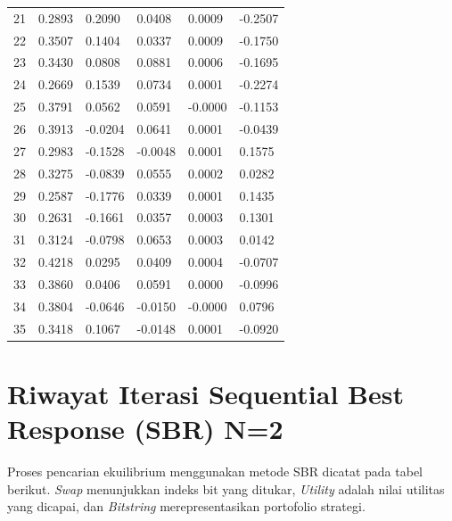 \begin{footnotesize}
\begin{longtable}{llllll}
21 & 0.2893 & 0.2090 & 0.0408 & 0.0009 & -0.2507 \\
22 & 0.3507 & 0.1404 & 0.0337 & 0.0009 & -0.1750 \\
23 & 0.3430 & 0.0808 & 0.0881 & 0.0006 & -0.1695 \\
24 & 0.2669 & 0.1539 & 0.0734 & 0.0001 & -0.2274 \\
25 & 0.3791 & 0.0562 & 0.0591 & -0.0000 & -0.1153 \\
26 & 0.3913 & -0.0204 & 0.0641 & 0.0001 & -0.0439 \\
27 & 0.2983 & -0.1528 & -0.0048 & 0.0001 & 0.1575 \\
28 & 0.3275 & -0.0839 & 0.0555 & 0.0002 & 0.0282 \\
29 & 0.2587 & -0.1776 & 0.0339 & 0.0001 & 0.1435 \\
30 & 0.2631 & -0.1661 & 0.0357 & 0.0003 & 0.1301 \\
31 & 0.3124 & -0.0798 & 0.0653 & 0.0003 & 0.0142 \\
32 & 0.4218 & 0.0295 & 0.0409 & 0.0004 & -0.0707 \\
33 & 0.3860 & 0.0406 & 0.0591 & 0.0000 & -0.0996 \\
34 & 0.3804 & -0.0646 & -0.0150 & -0.0000 & 0.0796 \\
35 & 0.3418 & 0.1067 & -0.0148 & 0.0001 & -0.0920 \\
\end{longtable}
\end{footnotesize}

\section{Riwayat Iterasi Sequential Best Response (SBR) N=2}

Proses pencarian ekuilibrium menggunakan metode SBR dicatat pada tabel berikut. \textit{Swap} menunjukkan indeks bit yang ditukar, \textit{Utility} adalah nilai utilitas yang dicapai, dan \textit{Bitstring} merepresentasikan portofolio strategi.

